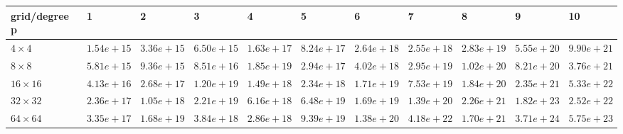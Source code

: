 \begin{tabular}{lllllllllll}
\hline
 grid/degree p   & 1          & 2          & 3          & 4          & 5          & 6          & 7          & 8          & 9          & 10         \\
\hline
 $4 \times 4$    & $1.54e+15$ & $3.36e+15$ & $6.50e+15$ & $1.63e+17$ & $8.24e+17$ & $2.64e+18$ & $2.55e+18$ & $2.83e+19$ & $5.55e+20$ & $9.90e+21$ \\
 $8 \times 8$    & $5.81e+15$ & $9.36e+15$ & $8.51e+16$ & $1.85e+19$ & $2.94e+17$ & $4.02e+18$ & $2.95e+19$ & $1.02e+20$ & $8.21e+20$ & $3.76e+21$ \\
 $16 \times 16$  & $4.13e+16$ & $2.68e+17$ & $1.20e+19$ & $1.49e+18$ & $2.34e+18$ & $1.71e+19$ & $7.53e+19$ & $1.84e+20$ & $2.35e+21$ & $5.33e+22$ \\
 $32 \times 32$  & $2.36e+17$ & $1.05e+18$ & $2.21e+19$ & $6.16e+18$ & $6.48e+19$ & $1.69e+19$ & $1.39e+20$ & $2.26e+21$ & $1.82e+23$ & $2.52e+22$ \\
 $64 \times 64$  & $3.35e+17$ & $1.68e+19$ & $3.84e+18$ & $2.86e+18$ & $9.39e+19$ & $1.38e+20$ & $4.18e+22$ & $1.70e+21$ & $3.71e+24$ & $5.75e+23$ \\
\hline
\end{tabular}